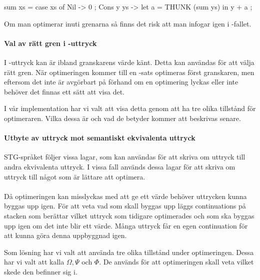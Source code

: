 \documentclass[Rapport]{subfiles}
\begin{document}
\begin{codeEx}
sum xs = case xs of
    { Nil -> 0
    ; Cons y ys -> let
        { a = THUNK (sum ys)
        } in y + a
    };
\end{codeEx}

Om man optimerar  inuti grenarna så finns det risk att man infogar 
igen i -fallet.

\paragraph{ Val av rätt gren i -uttryck }

I -uttryck kan är ibland granskarens värde känt. Detta kan användas
för att välja rätt gren. När optimeringen kommer till en -sats optimeras först granskaren,
men eftersom det inte är avgörbart på förhand om en optimering lyckas eller inte
behöver det finnas ett sätt att visa det. 

I vår implementation har vi valt att visa detta genom att ha tre olika tillstånd
för optimeraren. Vilka dessa är och vad de betyder kommer att beskrivas senare.

\paragraph{ Utbyte av uttryck mot semantiskt ekvivalenta uttryck}

STG-språket följer vissa lagar, som kan användas för att skriva om uttryck
till andra ekvivalenta uttryck. I vissa fall används dessa lagar för att skriva om
uttryck till något som är lättare att optimera.

\paragraph{}

Då optimeringen kan misslyckas med att ge ett värde behöver uttrycken kunna byggas upp
igen. För att veta vad som skall byggas upp läggs continuations på stacken
som berättar vilket uttryck som tidigare optimerades och som ska byggas upp igen om det
inte blir ett värde. Många uttryck får en egen continuation för att kunna göra denna
uppbyggnad igen.



Som lösning har vi valt att använda tre olika tillstånd under optimeringen. Dessa har vi valt att kalla
$\Omega, \Psi$ och $\Phi$. De används för att optimeringen skall veta vilket skede den
befinner sig i. 
\end{document}
